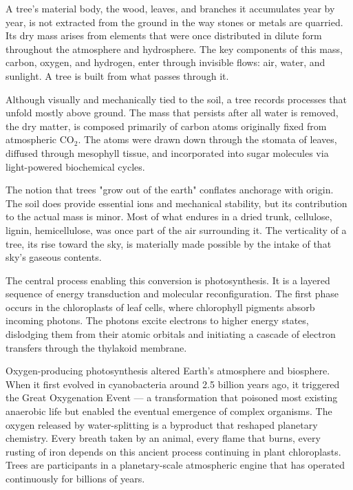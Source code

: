 A tree's material body, the wood, leaves, and branches it accumulates year by year, is not extracted from the ground in the way stones or metals are quarried. Its dry mass arises from elements that were once distributed in dilute form throughout the atmosphere and hydrosphere. The key components of this mass, carbon, oxygen, and hydrogen, enter through invisible flows: air, water, and sunlight. A tree is built from what passes through it.

Although visually and mechanically tied to the soil, a tree records processes that unfold mostly above ground. The mass that persists after all water is removed, the dry matter, is composed primarily of carbon atoms originally fixed from atmospheric \(\mathrm{CO}_2\). The atoms were drawn down through the stomata of leaves, diffused through mesophyll tissue, and incorporated into sugar molecules via light-powered biochemical cycles. 

The notion that trees "grow out of the earth" conflates anchorage with origin. The soil does provide essential ions and mechanical stability, but its contribution to the actual mass is minor. Most of what endures in a dried trunk, cellulose, lignin, hemicellulose, was once part of the air surrounding it. The verticality of a tree, its rise toward the sky, is materially made possible by the intake of that sky's gaseous contents.

The central process enabling this conversion is photosynthesis. It is a layered sequence of energy transduction and molecular reconfiguration. The first phase occurs in the chloroplasts of leaf cells, where chlorophyll pigments absorb incoming photons. The photons excite electrons to higher energy states, dislodging them from their atomic orbitals and initiating a cascade of electron transfers through the thylakoid membrane.

Oxygen-producing photosynthesis altered Earth's atmosphere and biosphere. When it first evolved in cyanobacteria around 2.5 billion years ago, it triggered the Great Oxygenation Event — a transformation that poisoned most existing anaerobic life but enabled the eventual emergence of complex organisms. The oxygen released by water-splitting is a byproduct that reshaped planetary chemistry. Every breath taken by an animal, every flame that burns, every rusting of iron depends on this ancient process continuing in plant chloroplasts. Trees are participants in a planetary-scale atmospheric engine that has operated continuously for billions of years.

